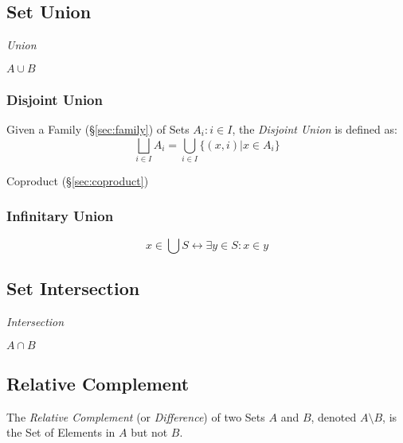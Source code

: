 \subsection{Set Union}\label{sec:set_union}

\emph{Union}

$A \cup B$



\subsubsection{Disjoint Union}\label{sec:disjoint_union}

Given a Family (\S\ref{sec:family}) of Sets ${A_i : i \in I}$,
the \emph{Disjoint Union} is defined as:
\[
  \bigsqcup_{i \in I} A_i = \bigcup_{i \in I} \{(x,i) | x \in A_i \}
\]

Coproduct (\S\ref{sec:coproduct})



\subsubsection{Infinitary Union}\label{sec:infinitary_union}

\[
  x \in \bigcup S \leftrightarrow \exists y \in S : x \in y
\]



\subsection{Set Intersection}\label{sec:set_intersection}

\emph{Intersection}

$A \cap B$



\subsection{Relative Complement}\label{sec:relative_complement}

The \emph{Relative Complement} (or \emph{Difference}) of two Sets $A$
and $B$, denoted $A \setminus B$, is the Set of Elements in $A$ but
not $B$.



